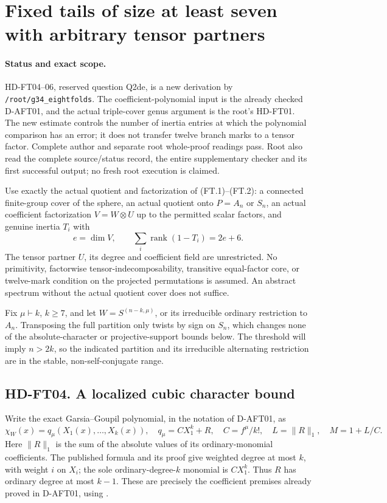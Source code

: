 \section{Fixed tails of size at least seven with arbitrary tensor partners}
\label{sec:factorwise-small-tail}

\paragraph{Status and exact scope.}
HD-FT04--06, reserved question Q2de, is a new derivation by
\texttt{/root/g34\_eightfolds}.  The coefficient-polynomial input is the
already checked D-AFT01, and the actual triple-cover genus argument is
the root's HD-FT01.  The new estimate controls the number of inertia
entries at which the polynomial comparison has an error; it does not
transfer twelve branch marks to a tensor factor.
Complete author and separate root whole-proof readings pass. Root also
read the complete source/status record, the entire supplementary checker
and its first successful output; no fresh root execution is claimed.

Use exactly the actual quotient and factorization of (FT.1)--(FT.2):
a connected finite-group cover of the sphere, an actual quotient onto
$P=A_n$ or $S_n$, an actual coefficient factorization $V=W\otimes U$
up to the permitted scalar factors, and genuine inertia $T_i$ with
\[
 e=\dim V,\qquad
             \sum_i\operatorname{rank}(1-T_i)=2e+6.
 \tag{FTL.1}
\]
The tensor partner $U$, its degree and coefficient field are unrestricted.
No primitivity, factorwise tensor-indecomposability, transitive equal-factor
core, or twelve-mark condition on the projected permutations is assumed.
An abstract spectrum without the actual quotient cover does not suffice.

Fix $\mu\vdash k$, $k\ge7$, and let $W=S^{(n-k,\mu)}$, or its
irreducible ordinary restriction to $A_n$.  Transposing the full partition
only twists by sign on $S_n$, which changes none of the absolute-character
or projective-support bounds below.  The threshold will imply $n>2k$,
so the indicated partition and its irreducible alternating restriction
are in the stable, non-self-conjugate range.

\subsection*{HD-FT04. A localized cubic character bound}

Write the exact Garsia--Goupil polynomial, in the notation of D-AFT01, as
\[
 \chi_W(x)=q_\mu(X_1(x),\ldots,X_k(x)),\quad
 q_\mu=C X_1^k+R,\quad C=f^\mu/k!,\quad
 L=\|R\|_1,\quad M=1+L/C.
 \tag{FTL.2}
\]
Here $\|R\|_1$ is the sum of the absolute values of its ordinary-monomial
coefficients.  The published formula and its proof give weighted degree
at most $k$, with weight $i$ on $X_i$; the sole ordinary-degree-$k$
monomial is $C X_1^k$.  Thus $R$ has ordinary degree at most $k-1$.
These are precisely the coefficient premises already proved in D-AFT01,
using \cite[Proposition~I.1 and its complete proof, pp.~9--11]{HD:GarsiaGoupil2009}.

